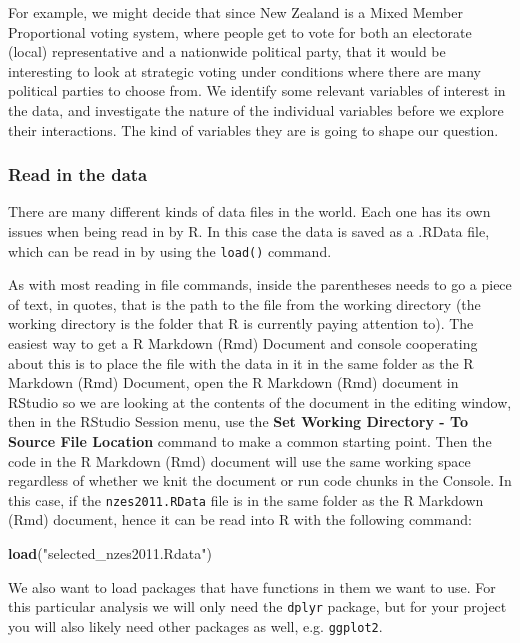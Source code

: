 \documentclass[]{article}
\newenvironment{Shaded}{\begin{snugshade}}{\end{snugshade}}
\newcommand{\KeywordTok}[1]{\textcolor[rgb]{0.13,0.29,0.53}{\textbf{#1}}}
\newcommand{\StringTok}[1]{\textcolor[rgb]{0.31,0.60,0.02}{#1}}
\newcommand{\NormalTok}[1]{#1}
\begin{document}
For example, we might decide that since New Zealand is a Mixed Member
Proportional voting system, where people get to vote for both an
electorate (local) representative and a nationwide political party, that
it would be interesting to look at strategic voting under conditions
where there are many political parties to choose from. We identify some
relevant variables of interest in the data, and investigate the nature
of the individual variables before we explore their interactions. The
kind of variables they are is going to shape our question.

\subsubsection{Read in the data}\label{read-in-the-data}

There are many different kinds of data files in the world. Each one has
its own issues when being read in by R. In this case the data is saved
as a .RData file, which can be read in by using the \texttt{load()}
command.

As with most reading in file commands, inside the parentheses needs to
go a piece of text, in quotes, that is the path to the file from the
working directory (the working directory is the folder that R is
currently paying attention to). The easiest way to get a R Markdown
(Rmd) Document and console cooperating about this is to place the file
with the data in it in the same folder as the R Markdown (Rmd) Document,
open the R Markdown (Rmd) document in RStudio so we are looking at the
contents of the document in the editing window, then in the RStudio
Session menu, use the \textbf{Set Working Directory - To Source File
Location} command to make a common starting point. Then the code in the
R Markdown (Rmd) document will use the same working space regardless of
whether we knit the document or run code chunks in the Console. In this
case, if the \texttt{nzes2011.RData} file is in the same folder as the R
Markdown (Rmd) document, hence it can be read into R with the following
command:

\begin{Shaded}
\begin{Highlighting}[]
\KeywordTok{load}\NormalTok{(}\StringTok{"selected_nzes2011.Rdata"}\NormalTok{)}
\end{Highlighting}
\end{Shaded}

We also want to load packages that have functions in them we want to
use. For this particular analysis we will only need the \texttt{dplyr}
package, but for your project you will also likely need other packages
as well, e.g. \texttt{ggplot2}.
\end{document}
